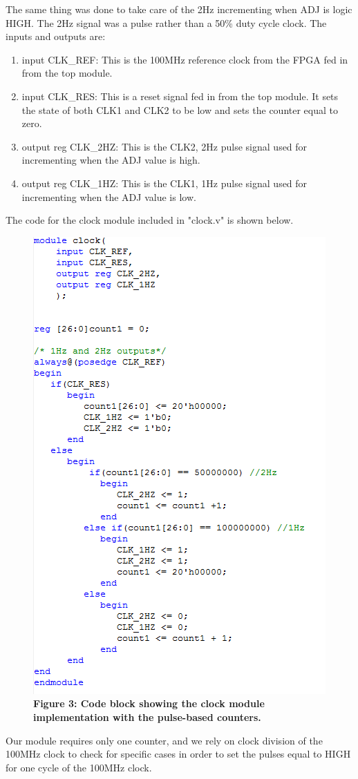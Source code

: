 \documentclass[journal]{IEEEtran}
\begin{document}
The same thing was done to take care of the 2Hz incrementing when ADJ is logic HIGH. The 2Hz signal was a pulse rather than a 50\% duty cycle clock. The inputs and outputs are:
\begin{enumerate}
	\item input CLK\_REF: This is the 100MHz reference clock from the FPGA fed in from the top module.
	\item input CLK\_RES: This is a reset signal fed in from the top module. It sets the state of both CLK1 and CLK2 to be low and sets the counter equal to zero.
	\item output reg CLK\_2HZ: This is the CLK2, 2Hz pulse signal used for incrementing when the ADJ value is high.
	\item output reg CLK\_1HZ: This is the CLK1, 1Hz pulse signal used for incrementing when the ADJ value is low.
\end{enumerate}
The code for the clock module included in "clock.v" is shown below.
\begin{figure}[H]
	\centering\includegraphics[scale=0.6]{clockmod}
	\caption{\textbf{Figure 3: Code block showing the clock module implementation with the pulse-based counters.}}
\end{figure}
Our module requires only one counter, and we rely on clock division of the 100MHz clock to check for specific cases in order to set the pulses equal to HIGH for one cycle of the 100MHz clock.
\end{document}
